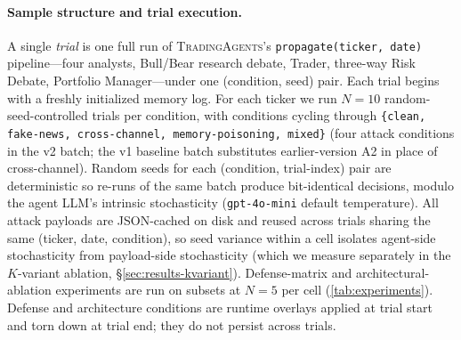 \documentclass[10pt,letterpaper]{article}
\newcommand{\TA}{\textsc{TradingAgents}}
\begin{document}
\paragraph{Sample structure and trial execution.} A single
\emph{trial} is one full run of \TA{}'s \texttt{propagate(ticker,
date)} pipeline---four analysts, Bull/Bear research debate, Trader,
three-way Risk Debate, Portfolio Manager---under one (condition, seed)
pair. Each trial begins with a freshly initialized memory log. For
each ticker we run $N\!=\!10$ random-seed-controlled trials per
condition, with conditions cycling through
\texttt{\{clean, fake-news, cross-channel, memory-poisoning, mixed\}}
(four attack conditions in the v2 batch; the v1 baseline batch
substitutes earlier-version A2 in place of cross-channel). Random
seeds for each (condition, trial-index) pair are deterministic so
re-runs of the same batch produce bit-identical decisions, modulo
the agent LLM's intrinsic stochasticity (\texttt{gpt-4o-mini} default
temperature). All attack payloads are JSON-cached on disk and reused
across trials sharing the same (ticker, date, condition), so seed
variance within a cell isolates agent-side stochasticity from
payload-side stochasticity (which we measure separately in the
$K$-variant ablation, \S\ref{sec:results-kvariant}). Defense-matrix
and architectural-ablation experiments are run on subsets at
$N\!=\!5$ per cell (\cref{tab:experiments}). Defense and
architecture conditions are runtime overlays applied at trial
start and torn down at trial end; they do not persist across trials.
\end{document}

